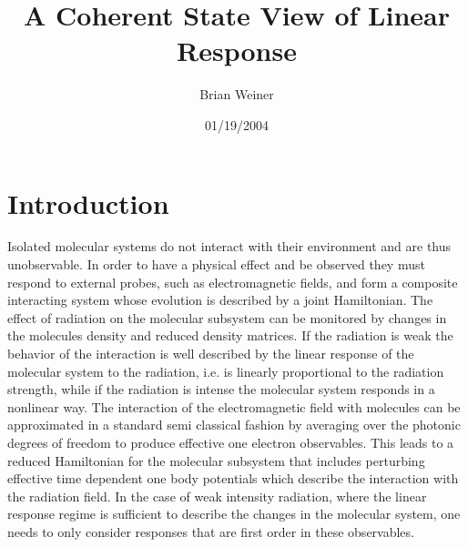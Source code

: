 \documentclass[aps,preprint]{revtex4}%
\begin{document}
\preprint{ }
\title[Coh. State Lin. Res..]{A Coherent State View of Linear Response}
\author{Brian Weiner}
\keywords{}
\begin{abstract}


\end{abstract}
\date{01/19/2004}
\maketitle
\tableofcontents


\section{Introduction\label{intro}}

Isolated molecular systems do not interact with their environment and are thus
unobservable. In order to have a physical effect and be observed they must
respond to external probes, such as electromagnetic fields, and form a
composite interacting system whose evolution is described by a joint
Hamiltonian. The effect of radiation on the molecular subsystem can be
monitored by changes in the molecules density and reduced density matrices. If
the radiation is weak the behavior of the interaction is well described by the
linear response of the molecular system to the radiation, i.e. is linearly
proportional to the radiation strength, while if the radiation is intense the
molecular system responds in a nonlinear way. The interaction of the
electromagnetic field with molecules can be approximated in a standard semi
classical fashion by averaging over the photonic degrees of freedom to produce
effective one electron observables. This leads to a reduced Hamiltonian for
the molecular subsystem that includes perturbing effective time dependent one
body potentials which describe the interaction with the radiation field. In
the case of weak intensity radiation, where the linear response regime is
sufficient to describe the changes in the molecular system, one needs to only
consider responses that are first order in these observables.
\end{document}
